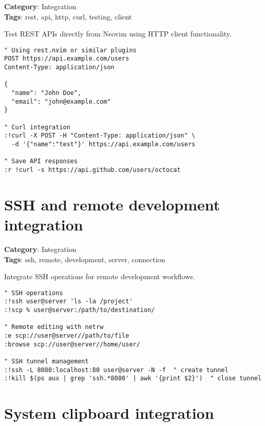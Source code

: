{{{{{{\textbf{Category}: Integration\\ \textbf{Tags}: rest, api, http, curl, testing, client
\vspace{0.5cm}

Test REST APIs directly from Neovim using HTTP client functionality.

\begin{Exa*}{}
\begin{Verbatim}[fontsize=\footnotesize, breaklines, breakanywhere]
" Using rest.nvim or similar plugins
POST https://api.example.com/users
Content-Type: application/json

{
  "name": "John Doe",
  "email": "john@example.com"
}

" Curl integration
:!curl -X POST -H "Content-Type: application/json" \
  -d '{"name":"test"}' https://api.example.com/users

" Save API responses
:r !curl -s https://api.github.com/users/octocat
\end{Verbatim}
\end{Exa*}

\section{SSH and remote development integration}

\textbf{Category}: Integration\\ \textbf{Tags}: ssh, remote, development, server, connection
\vspace{0.5cm}

Integrate SSH operations for remote development workflows.

\begin{Exa*}{}
\begin{Verbatim}[fontsize=\footnotesize, breaklines, breakanywhere]
" SSH operations
:!ssh user@server 'ls -la /project'
:!scp % user@server:/path/to/destination/

" Remote editing with netrw
:e scp://user@server//path/to/file
:browse scp://user@server//home/user/

" SSH tunnel management
:!ssh -L 8080:localhost:80 user@server -N -f  " create tunnel
:!kill $(ps aux | grep 'ssh.*8080' | awk '{print $2}')  " close tunnel
\end{Verbatim}
\end{Exa*}

\section{System clipboard integration}

}}}}}}
